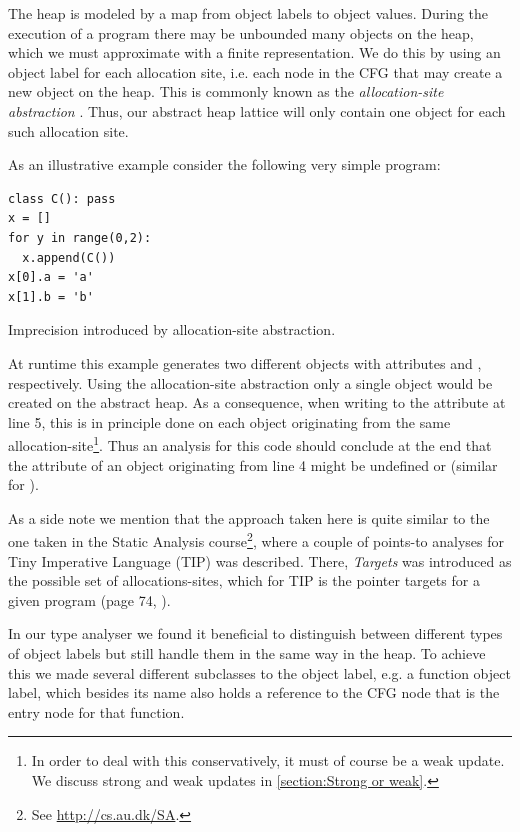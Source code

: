 The heap is modeled by a map from object labels to object values. During the execution of a program there may be unbounded many objects on the heap, which we must approximate with a finite representation. We do this by using an object label for each allocation site, i.e. each node in the CFG that may create a new object on the heap. This is commonly known as the \textit{allocation-site abstraction} \cite{recency,aopas} . Thus, our abstract heap lattice will only contain one object for each such allocation site.

As an illustrative example consider the following very simple program:

\begin{listing}[H]
	\begin{verbatim}
class C(): pass
x = []
for y in range(0,2):
  x.append(C())
x[0].a = 'a'
x[1].b = 'b'
	\end{verbatim}
	\caption{Imprecision introduced by allocation-site abstraction.}
\end{listing}

At runtime this example generates two different  objects with attributes  and , respectively. Using the allocation-site abstraction only a single  object would be created on the abstract heap. As a consequence, when writing to the attribute  at line 5, this is in principle done on each object originating from the same allocation-site\footnote{In order to deal with this conservatively, it must of course be a weak update. We discuss strong and weak updates in \autoref{section:Strong or weak}.}. Thus an analysis for this code should conclude at the end that the attribute  of an object originating from line 4 might be undefined or  (similar for ).

As a side note we mention that the approach taken here is quite similar to the one taken in the Static Analysis course\footnote{See \url{http://cs.au.dk/SA}.}, where a couple of points-to analyses for Tiny Imperative Language (TIP) was described. There, \textit{Targets} was introduced as the possible set of allocations-sites, which for TIP is the pointer targets  for a given program (page 74, \cite{sa}).

In our type analyser we found it beneficial to distinguish between different types of object labels but still handle them in the same way in the heap. To achieve this we made several different subclasses to the object label, e.g. a function object label, which besides its name also holds a reference to the CFG node that is the entry node for that function.


